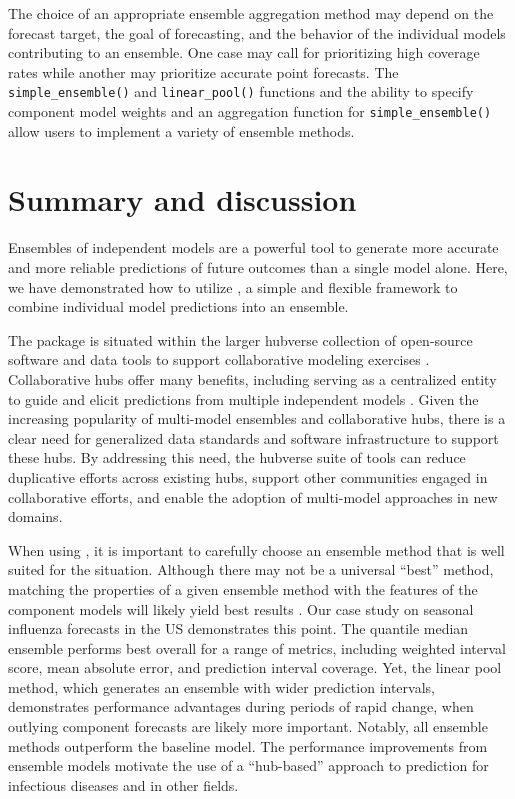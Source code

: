 \documentclass[
  article,
  shortnames,
  notitle]{jss}
\begin{document}
The choice of an appropriate ensemble aggregation method may depend on
the forecast target, the goal of forecasting, and the behavior of the
individual models contributing to an ensemble. One case may call for
prioritizing high coverage rates while another may prioritize accurate
point forecasts. The \texttt{simple\_ensemble()} and
\texttt{linear\_pool()} functions and the ability to specify component
model weights and an aggregation function for
\texttt{simple\_ensemble()} allow users to implement a variety of
ensemble methods.

\section{Summary and discussion}\label{sec-conclusions}

Ensembles of independent models are a powerful tool to generate more
accurate and more reliable predictions of future outcomes than a single
model alone. Here, we have demonstrated how to utilize
, a simple and flexible framework to combine
individual model predictions into an ensemble.

The  package is situated within the larger hubverse
collection of open-source software and data tools to support
collaborative modeling exercises \citep{hubverse_docs}. Collaborative
hubs offer many benefits, including serving as a centralized entity to
guide and elicit predictions from multiple independent models
\citep{reich2022}. Given the increasing popularity of multi-model
ensembles and collaborative hubs, there is a clear need for generalized
data standards and software infrastructure to support these hubs. By
addressing this need, the hubverse suite of tools can reduce duplicative
efforts across existing hubs, support other communities engaged in
collaborative efforts, and enable the adoption of multi-model approaches
in new domains.

When using , it is important to carefully choose an
ensemble method that is well suited for the situation. Although there
may not be a universal ``best'' method, matching the properties of a
given ensemble method with the features of the component models will
likely yield best results \citep{howerton2023}. Our case study on
seasonal influenza forecasts in the US demonstrates this point. The
quantile median ensemble performs best overall for a range of metrics,
including weighted interval score, mean absolute error, and prediction
interval coverage. Yet, the linear pool method, which generates an
ensemble with wider prediction intervals, demonstrates performance
advantages during periods of rapid change, when outlying component
forecasts are likely more important. Notably, all ensemble methods
outperform the baseline model. The performance improvements from
ensemble models motivate the use of a ``hub-based'' approach to
prediction for infectious diseases and in other fields.
\end{document}
